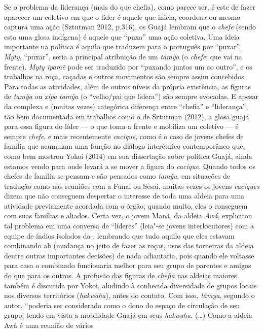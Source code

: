 Se o problema da liderança (mais do que chefia), como parece ser, é este
de fazer aparecer um coletivo em que o líder é aquele que inicia,
coordena ou mesmo captura uma ação (Sztutman 2012, p.316), os Guajá
lembram que o \emph{chefe} (sendo esta uma glosa indígena) é aquele que
``puxa'' uma ação coletiva. Uma ideia importante na política é aquilo
que traduzem para o português por ``puxar''. \emph{Myty}, ``puxar'',
seria a principal atribuição de um \emph{tamỹa} (o \emph{chefe}; que vai
na frente). \emph{Myty ipamẽ} pode ser traduzido por ``puxando juntos um
ao outro'', e os trabalhos na roça, caçadas e outros movimentos são
sempre assim concebidos. Para todas as atividades, além de outros níveis
da própria existência, as figuras de \emph{tamỹa} ou \emph{xipa}
\emph{tamỹa} (o ``velho/pai que lidera'') são sempre evocadas. E apesar
da complexa e (muitas vezes) categórica diferença entre ``chefia'' e
``liderança'', tão bem documentada em trabalhos como o de Sztutman
(2012), a glosa guajá para essa figura do líder --- o que toma a frente e
mobiliza um coletivo --- é sempre \emph{chefe}, e mais recentemente
\emph{cacique}, como é o caso de jovens chefes de família que acumulam
uma função no diálogo interétnico contemporâneo que, como bem mostrou
Yokoi (2014) em sua dissertação sobre política Guajá, ainda estamos
vendo para onde levará a se mover a figura do \emph{cacique}. Quando
todos os chefes de família se pensam e são pensados como \emph{tamỹa},
em situações de tradução como nas reuniões com a Funai ou Sesai, muitas
vezes os jovens \emph{caciques} dizem que não conseguem despertar o
interesse de toda uma aldeia para uma atividade previamente acordada com
o órgão; quando muito, eles o conseguem com suas famílias e aliados.
Certa vez, o jovem Manã, da aldeia \emph{Awá}, explicitou tal problema
em uma conversa de ``líderes'' (leia"-se jovens interlocutores) com a
equipe de índios isolados da , lembrando que tudo aquilo que eles
estavam combinando ali (mudança no jeito de fazer as roças, usos das
torneiras da aldeia dentre outras importantes decisões) de nada
adiantaria, pois quando ele voltasse para casa o combinado funcionaria
melhor para seu grupo de parentes e amigos do que para os outros. A
profusão das figuras de \emph{chefia} nas aldeias maiores também é
discutida por Yokoi, aludindo à conhecida diversidade de grupos locais
nos diversos territórios (\emph{hakwaha}), antes do contato. Com isso,
\emph{tãmya}, segundo o autor, ``poderia ser considerado como o dono do
espaço de circulação de seu grupo, tendo em vista a mobilidade Guajá em
seus \emph{hakwaha}. (\ldots{}) Como a aldeia Awá é uma reunião de vários
